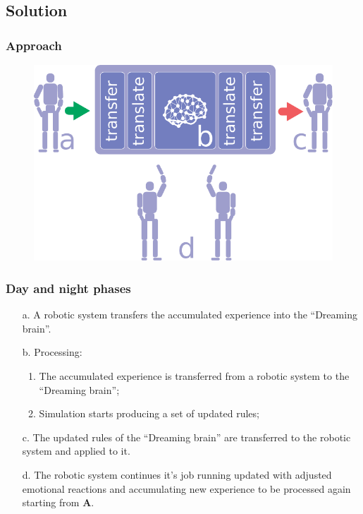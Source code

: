 \documentclass[12pt, aspectratio=169]{beamer}
\begin{document}
\subsection{Solution}

\begin{frame}
\frametitle{Approach}
\begin{figure}
\includegraphics[width=0.8\linewidth]{robot-dream}
\end{figure}
\end{frame}


\begin{frame}
\frametitle{Day and night phases}

\begin{enumerate}
  \item[a.] A robotic system transfers the accumulated experience into the ``Dreaming brain''.
  \item[b.] Processing:
      \begin{enumerate}
      \item The accumulated experience is transferred from a robotic system to the ``Dreaming brain'';
      \item Simulation starts producing a set of updated rules;
      \end{enumerate}
  \item[c.] The updated rules of the ``Dreaming brain'' are transferred to the robotic system and applied to it.
  \item[d.] The robotic system continues it's job running updated with adjusted emotional reactions and accumulating new experience to be processed again starting from \textbf{A}.
  \end{enumerate}

\end{frame}
\end{document}

